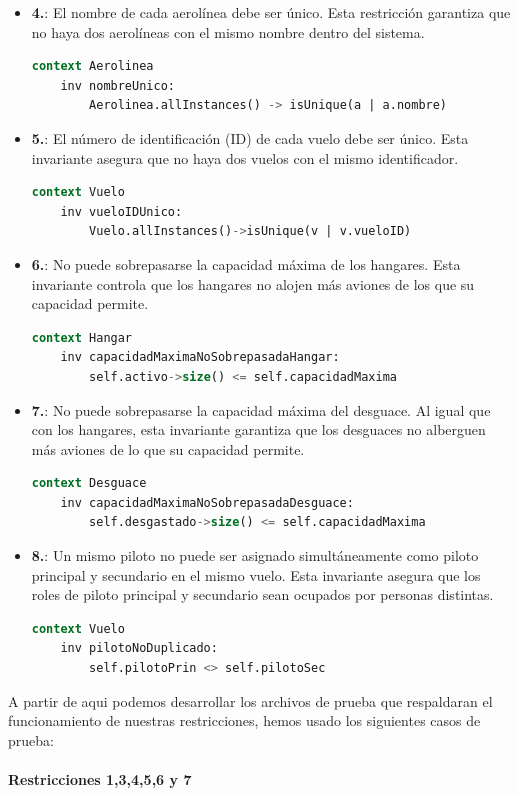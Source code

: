 \documentclass[12pt.a4paper]{article}
\begin{document}
\begin{itemize}
    \item \textbf{4.}: El nombre de cada aerolínea debe ser único. Esta restricción garantiza que no haya dos aerolíneas con el mismo nombre dentro del sistema.
    \begin{lstlisting}[style = useEspecifico,language=SQL]
  context Aerolinea
    inv nombreUnico: 
        Aerolinea.allInstances() -> isUnique(a | a.nombre)
    \end{lstlisting}
    
    \item \textbf{5.}: El número de identificación (ID) de cada vuelo debe ser único. Esta invariante asegura que no haya dos vuelos con el mismo identificador.
    \begin{lstlisting}[style = useEspecifico,language=SQL]
  context Vuelo
    inv vueloIDUnico: 
        Vuelo.allInstances()->isUnique(v | v.vueloID)
    \end{lstlisting}
    
    \item \textbf{6.}: No puede sobrepasarse la capacidad máxima de los hangares. Esta invariante controla que los hangares no alojen más aviones de los que su capacidad permite.
    \begin{lstlisting}[style = useEspecifico,language=SQL]
  context Hangar
    inv capacidadMaximaNoSobrepasadaHangar: 
        self.activo->size() <= self.capacidadMaxima
    \end{lstlisting}
    
    \item \textbf{7.}: No puede sobrepasarse la capacidad máxima del desguace. Al igual que con los hangares, esta invariante garantiza que los desguaces no alberguen más aviones de lo que su capacidad permite.
    \begin{lstlisting}[style = useEspecifico,language=SQL]
  context Desguace
    inv capacidadMaximaNoSobrepasadaDesguace:
        self.desgastado->size() <= self.capacidadMaxima
    \end{lstlisting}
    
    \vspace{1 cm}
    \item \textbf{8.}: Un mismo piloto no puede ser asignado simultáneamente como piloto principal y secundario en el mismo vuelo. Esta invariante asegura que los roles de piloto principal y secundario sean ocupados por personas distintas.
    \begin{lstlisting}[style = useEspecifico,language=SQL]
  context Vuelo
    inv pilotoNoDuplicado: 
        self.pilotoPrin <> self.pilotoSec
    \end{lstlisting}
\end{itemize}
\vspace{1.0 cm}
A partir de aqui podemos desarrollar los archivos de prueba que respaldaran el funcionamiento de nuestras restricciones, hemos usado los siguientes casos de prueba:\\\\
\textbf{Restricciones 1,3,4,5,6 y 7}\\\\
\end{document}
